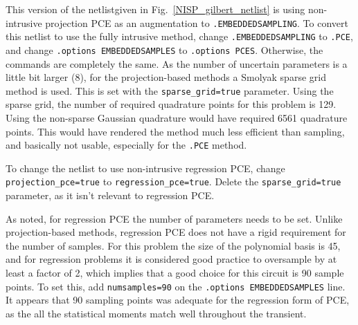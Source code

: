 This version of the netlistgiven in Fig.~\ref{NISP_gilbert_netlist}
is using non-intrusive projection PCE as an augmentation to \texttt{.EMBEDDEDSAMPLING}.  
To convert this netlist to 
use the fully intrusive method, change \texttt{.EMBEDDEDSAMPLING} to \texttt{.PCE}, and 
change \texttt{.options EMBEDDEDSAMPLES} to \texttt{.options PCES}.   Otherwise, the commands are completely the same.
As the number of uncertain parameters is a little bit larger (8), for the projection-based methods a 
Smolyak sparse grid~\cite{Smolyak_63} method is used.  This is set with the  \texttt{sparse\_grid=true} parameter. 
Using the sparse grid, the number of 
required quadrature points for this problem is 129.  Using the non-sparse Gaussian quadrature 
would have required 6561 quadrature points. This would have rendered the method much 
less efficient than sampling, and basically not usable, especially for the \texttt{.PCE} method.

To change the netlist to use non-intrusive regression PCE, change \texttt{projection\_pce=true} 
to \texttt{regression\_pce=true}.  Delete the \texttt{sparse\_grid=true} parameter, as 
it isn't relevant to regression PCE.  

As noted, for regression PCE the number of parameters needs to be set.  Unlike projection-based methods, 
regression PCE does not have a rigid requirement for the number of samples.  For this 
problem the size of the polynomial basis is 45, and for regression problems it 
is considered good practice to oversample by at least a factor of 2, which implies that
a good choice for this circuit is 90 sample points.   
To set this, add \texttt{numsamples=90} on the \texttt{.options EMBEDDEDSAMPLES} line.  
It appears that 90 sampling points was 
adequate for the regression form of PCE, as the all the statistical moments 
match well throughout the transient.

